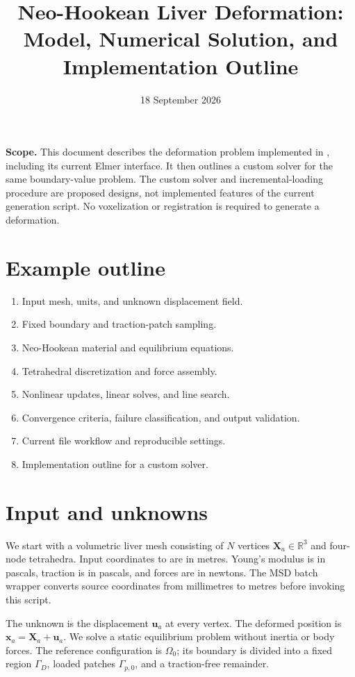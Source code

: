 \documentclass[11pt]{article}
\title{Neo-Hookean Liver Deformation:\\Model, Numerical Solution, and Implementation Outline}
\author{}
\date{18 September 2026}
\newcommand{\vect}[1]{\boldsymbol{#1}}
\newcommand{\R}{\mathbb{R}}
\begin{document}
\maketitle

\textbf{Scope.} This document describes the deformation problem implemented in
, including its current Elmer interface. It then
outlines a custom solver for the same boundary-value problem. The custom solver
and incremental-loading procedure are proposed designs, not implemented features
of the current generation script. No voxelization or registration is required
to generate a deformation.

\section*{Example outline}
\begin{enumerate}
  \item Input mesh, units, and unknown displacement field.
  \item Fixed boundary and traction-patch sampling.
  \item Neo-Hookean material and equilibrium equations.
  \item Tetrahedral discretization and force assembly.
  \item Nonlinear updates, linear solves, and line search.
  \item Convergence criteria, failure classification, and output validation.
  \item Current file workflow and reproducible settings.
  \item Implementation outline for a custom solver.
\end{enumerate}

\section{Input and unknowns}
We start with a volumetric liver mesh consisting of $N$ vertices
$\vect{X}_a\in\R^3$ and four-node tetrahedra. Input coordinates to
 are in metres. Young's modulus is in pascals, traction is in
pascals, and forces are in newtons. The MSD batch wrapper converts source
coordinates from millimetres to metres before invoking this script.

The unknown is the displacement $\vect{u}_a$ at every vertex. The deformed
position is $\vect{x}_a=\vect{X}_a+\vect{u}_a$. We solve a static equilibrium
problem without inertia or body forces. The reference configuration is
$\Omega_0$; its boundary is divided into a fixed region $\Gamma_D$, loaded
patches $\Gamma_{p,0}$, and a traction-free remainder.
\end{document}
